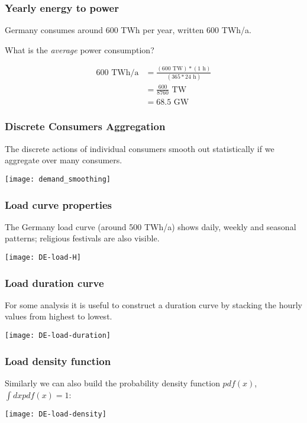 \documentclass[10pt,aspectratio=169,dvipsnames]{beamer}
\begin{document}
\begin{frame}
  \frametitle{Yearly energy to power}

  Germany consumes around 600 TWh per year, written 600 TWh/a.

  What is the \emph{average} power consumption?

  \begin{align*}
    600\textrm{ TWh/a} & = \frac{(600\textrm{ TW}) * (1\textrm{ h})}{(365*24 \textrm{ h})} \\
    & =  \frac{600}{8760} \textrm{ TW} \\
    & = 68.5 \textrm{ GW}
  \end{align*}

\end{frame}



\begin{frame}
  \frametitle{Discrete Consumers Aggregation}

  The discrete actions of individual consumers smooth out
  statistically if we aggregate over many consumers.

  \centering
  \texttt{[image: demand\_smoothing]}

\end{frame}


\begin{frame}
  \frametitle{Load curve properties}

  The Germany load curve (around 500 TWh/a) shows \alert{daily}, \alert{weekly} and
  \alert{seasonal} patterns; religious festivals are also visible.

  \centering
  \texttt{[image: DE-load-H]}

\end{frame}



\begin{frame}
  \frametitle{Load duration curve}

  For some analysis it is useful to construct a \alert{duration curve}
  by stacking the hourly values from highest to lowest.

  \centering
  \texttt{[image: DE-load-duration]}

\end{frame}




\begin{frame}
  \frametitle{Load density function}

  Similarly we can also build the \alert{probability density function} $pdf(x)$, $\int dx pdf(x) = 1$:

  \centering
  \texttt{[image: DE-load-density]}

\end{frame}
\end{document}
